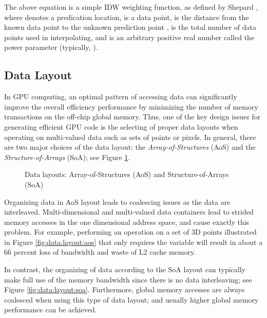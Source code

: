 The above equation is a simple IDW weighting function, as defined by 
Shepard \cite{shepard1968}, where  denotes a predication location,  is a data 
point,  is the distance from the known data point  to the unknown 
prediction point ,  is the total number of data points used in 
interpolating, and  is an arbitrary positive real number called the power 
parameter (typically, ).


\subsection{Data Layout}
\label{sec:back:layout}

In GPU computing, an optimal pattern of accessing data can significantly 
improve the overall efficiency performance by minimizing the number of 
memory transactions on the off-chip global memory. Thus, one of the key 
design issues for generating efficient GPU code is the selecting of proper 
data layouts when operating on multi-valued data such as sets of points or 
pixels. In general, there are two major choices of the data layout: the 
\textit{Array-of-Structures} (AoS) and the \textit{Structure-of-Arrays} (SoA); see Figure \ref{fig:data:layout}. 

\begin{figure}[htb]
    \centering
    \hspace{1em}
    \caption{Data layouts: Array-of-Structures (AoS) and Structure-of-Arrays (SoA)}
    \label{fig:data:layout}       \end{figure}

Organizing data in AoS layout leads to coalescing issues as the data are 
interleaved. Multi-dimensional and multi-valued data containers lead to 
strided memory accesses in the one dimensional address space, and cause 
exactly this problem. For example, performing an operation on a set of 3D 
points illustrated in Figure \ref{fig:data:layout:aos} that only requires the variable  will 
result in about a 66 percent loss of bandwidth and waste of L2 cache memory.

In contrast, the organizing of data according to the SoA layout can 
typically make full use of the memory bandwidth since there is no data 
interleaving; see Figure \ref{fig:data:layout:soa}. Furthermore, global memory accesses are always coalesced when 
using this type of data layout; and usually higher global memory performance 
can be achieved. 

